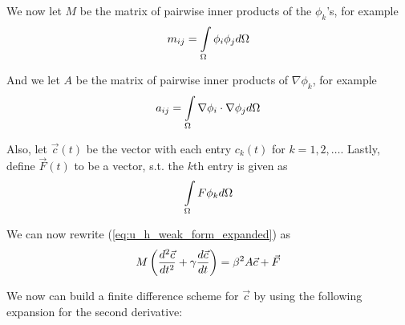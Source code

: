 \documentclass[a4paper,12pt]{article}
\begin{document}
We now let $M$ be the matrix of pairwise inner products of the $\phi_k$'s, for example
\begin{equation} \label{eq:m_definition}
m_{ij} = \int\limits_{\Omega} \phi_i \phi_j d\Omega
\end{equation}

And we let $A$ be the matrix of pairwise inner products of $\nabla \phi_k$, for example
\begin{equation} \label{eq:a_definition}
a_{ij} = \int\limits_{\Omega} \nabla \phi_i \cdot \nabla \phi_j d\Omega
\end{equation}

Also, let $\vec{c}(t)$ be the vector with each entry $c_k(t)$ for $k=1, 2, \ldots$. Lastly, define
$\vec{F}(t)$ to be a vector, s.t. the $k$th entry is given as 
\begin{equation} \label{eq:vec_F_definition}
\int\limits_{\Omega} F \phi_k d\Omega
\end{equation}

We can now rewrite (\ref{eq:u_h_weak_form_expanded}) as
\begin{equation} \label{eq:u_h_matrix}
M\left( \frac{d^2 \vec{c}}{d t^2} + \gamma\frac{d \vec{c}}{d t} \right) = \beta^2 A \vec{c} + \vec{F}
\end{equation}

We now can build a finite difference scheme for $\vec{c}$ by using the following expansion for the second derivative:
\begin{equation} \label{eq:second_derivative_finite_difference}
\end{equation}
\end{document}
